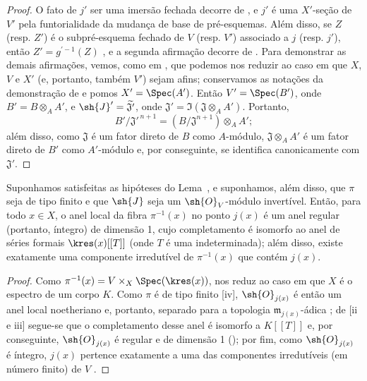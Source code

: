 \documentclass[oneside,10pt]{amsart}
\let\EGAOriginalLabel\label
\renewcommand{\label}[1]{\phantomsection\EGAOriginalLabel{#1}}
\begin{document}
\begin{proof}
O fato de $j'$ ser uma imersão fechada decorre de , e $j'$ é uma $X'$-seção de $V'$ pela funtorialidade da mudança de base de pré-esquemas.
Além disso, se $Z$ (resp. $Z'$) é o subpré-esquema fechado de $V$ (resp. $V'$) associado a $j$ (resp. $j'$), então $Z'=g^{'-1}(Z)$ , e a segunda afirmação decorre de .
Para demonstrar as demais afirmações, vemos, como em , que podemos nos reduzir ao caso em que $X$, $V$ e $X'$ (e, portanto, também $V'$) sejam afins;
conservamos as notações da demonstração de  e pomos $X'=\Spec(A')$.
Então $V'=\Spec(B')$, onde $B'=B\otimes_A A'$, e $\sh{J}'=\widetilde{\mathfrak{J}'}$, onde $\mathfrak{J}'=\Im(\mathfrak{J}\otimes_A A')$.
Portanto,
\[
  B'/\mathfrak{J}'^{\,n+1}
  =(B/\mathfrak{J}^{n+1})\otimes_A A';
\]
além disso, como $\mathfrak{J}$ é um fator direto de $B$ como $A$-módulo, $\mathfrak{J}\otimes_A A'$ é um fator direto de $B'$ como $A'$-módulo e, por conseguinte, se identifica canonicamente com $\mathfrak{J}'$.
\end{proof}

\begin{corollary}[8.10.3]
\label{II.8.10.3}
Suponhamos satisfeitas as hipóteses do Lema~, e suponhamos, além disso, que $\pi$ seja de tipo finito e que $\sh{J}$ seja um $\sh{O}_V$-módulo invertível.
Então, para todo $x\in X$, o anel local da fibra $\pi^{-1}(x)$ no ponto $j(x)$ é um anel regular (portanto, íntegro) de dimensão 1, cujo completamento é isomorfo ao anel de séries formais $\kres(x)[[T]]$ (onde $T$ é uma indeterminada);
além disso, existe exatamente uma componente irredutível de $\pi^{-1}(x)$ que contém $j(x)$.
\end{corollary}

\begin{proof}
Como $\pi^{-1}(x)=V\times_X\Spec(\kres(x))$,  nos reduz ao caso em que $X$ é o espectro de um corpo $K$.
Como $\pi$ é de tipo finito [iv], $\sh{O}_{j(x)}$ é então um anel local noetheriano e, portanto, separado para a topologia $\mathfrak{m}_{j(x)}$-ádica ;
de [ii e iii] segue-se que o completamento desse anel é isomorfo a $K[[T]]$ e, por conseguinte, $\sh{O}_{j(x)}$ é regular e de dimensão 1 (\cite[p.~17-01, th.~1]{I-1});
por fim, como $\sh{O}_{j(x)}$ é íntegro, $j(x)$ pertence exatamente a uma das componentes irredutíveis (em número finito) de $V$ .
\end{proof}
\end{document}
